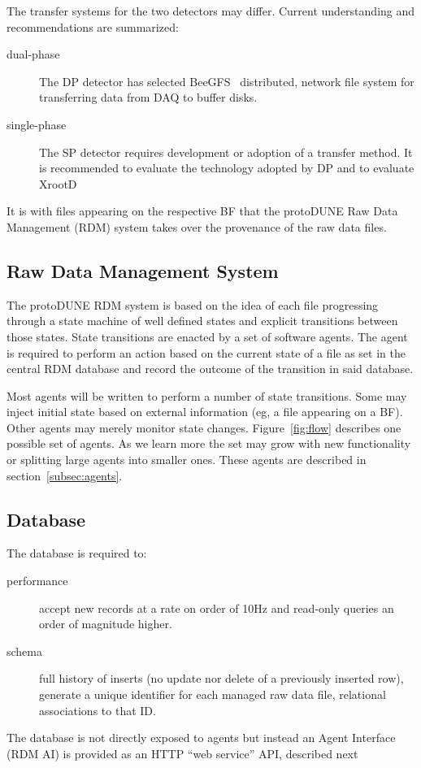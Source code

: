 \documentclass[pdftex,12pt,letter]{article}
\begin{document}
The transfer systems for the two detectors may differ.  Current
understanding and recommendations are summarized:

\begin{description}
\item[dual-phase] The DP detector has selected BeeGFS~\cite{beegfs}
  distributed, network file system for transferring data from DAQ to
  buffer disks.  

\item[single-phase] The SP detector requires development or adoption
  of a transfer method.  It is recommended to evaluate the technology
  adopted by DP and to evaluate XrootD~\cite{xrootd}
\end{description}

It is with files appearing on the respective BF that the protoDUNE Raw
Data Management (RDM) system takes over the provenance of the raw data
files.

\subsection{Raw Data Management System}

The protoDUNE RDM system is based on the idea of each file progressing
through a state machine of well defined states and explicit
transitions between those states.  State transitions are enacted by a
set of software agents.  The agent is required to perform an action
based on the current state of a file as set in the central RDM
database and record the outcome of the transition in said database.

Most agents will be written to perform a number of state transitions.
Some may inject initial state based on external information (eg, a
file appearing on a BF).  Other agents may merely monitor state
changes.  Figure~\ref{fig:flow} describes one possible set of agents.
As we learn more the set may grow with new functionality or splitting
large agents into smaller ones.  These agents are described in
section~\ref{subsec:agents}.

\subsection{Database}

The database is required to:
\begin{description}
\item[performance] accept new records at a rate on order of 10Hz and
  read-only queries an order of magnitude higher.
\item[schema] full history of inserts (no update nor delete of a
  previously inserted row), generate a unique identifier for each managed
  raw data file, relational associations to that ID.
\end{description}
The database is not directly exposed to agents but instead an Agent
Interface (RDM AI) is provided as an HTTP ``web service'' API,
described next
\end{document}
